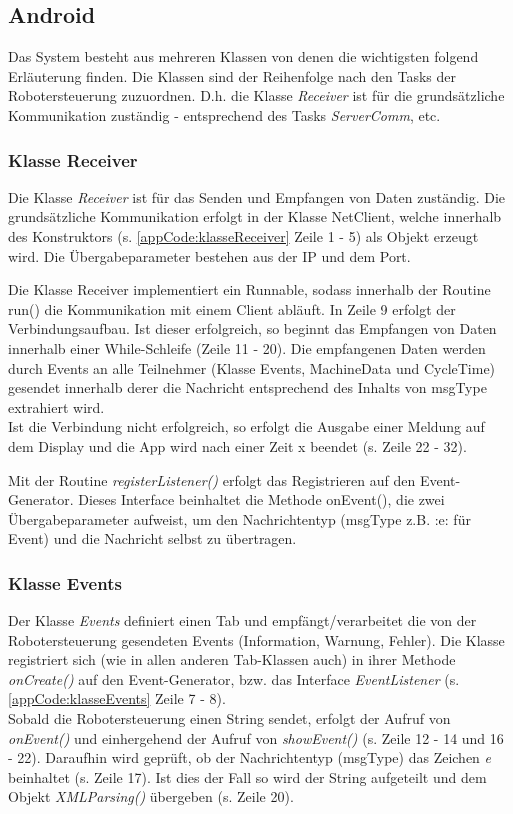 \subsection{Android}
\label{sec:ChapterAndroid}
Das System besteht aus mehreren Klassen von denen die wichtigsten folgend 
Erläuterung finden. Die Klassen sind der Reihenfolge nach den Tasks der 
Robotersteuerung zuzuordnen. D.h. die Klasse \textit{Receiver} ist für die 
grundsätzliche Kommunikation zuständig - entsprechend des Tasks 
\textit{ServerComm}, etc.

\subsubsection{Klasse Receiver}
Die Klasse \textit{Receiver} ist für das Senden und Empfangen von Daten 
zuständig. Die grundsätzliche Kommunikation erfolgt in der Klasse NetClient, 
welche innerhalb des Konstruktors (s. \ref{appCode:klasseReceiver} Zeile 1 - 5) 
als Objekt erzeugt wird. Die Übergabeparameter bestehen aus der IP und dem Port.

Die Klasse Receiver implementiert ein Runnable, sodass innerhalb der Routine 
run() die Kommunikation mit einem Client abläuft. In Zeile 9 erfolgt der 
Verbindungsaufbau. Ist dieser erfolgreich, so beginnt das Empfangen von Daten 
innerhalb einer While-Schleife (Zeile 11 - 20). Die empfangenen Daten werden 
durch Events an alle Teilnehmer (Klasse Events, MachineData und CycleTime) 
gesendet innerhalb derer die Nachricht entsprechend des Inhalts von 
msgType extrahiert wird.\\
Ist die Verbindung nicht erfolgreich, so erfolgt die Ausgabe einer Meldung auf 
dem Display und die App wird nach einer Zeit x beendet (s. Zeile 22 - 32).

Mit der Routine \textit{registerListener()} erfolgt das Registrieren auf den 
Event-Generator. Dieses Interface beinhaltet die Methode onEvent(), die zwei 
Übergabeparameter aufweist, um den Nachrichtentyp (msgType z.B. :e: für Event) 
und die Nachricht selbst zu übertragen.



\subsubsection{Klasse Events}
Der Klasse \textit{Events} definiert einen Tab und empfängt/verarbeitet die von 
der Robotersteuerung gesendeten Events (Information, Warnung, Fehler). Die 
Klasse registriert sich (wie in allen anderen Tab-Klassen auch) in ihrer 
Methode \textit{onCreate()} auf den Event-Generator, bzw. das Interface 
\textit{EventListener} (s. \ref{appCode:klasseEvents} Zeile 7 - 8).\\
Sobald die Robotersteuerung einen String sendet, erfolgt der Aufruf von 
\textit{onEvent()} und einhergehend der Aufruf von \textit{showEvent()} (s. 
Zeile 12 - 14 und 16 - 22). Daraufhin wird geprüft, ob der Nachrichtentyp 
(msgType) das 
Zeichen \textit{e} beinhaltet (s. Zeile 17). Ist dies der Fall so wird der 
String aufgeteilt und dem Objekt \textit{XMLParsing()} übergeben (s. Zeile 20).


